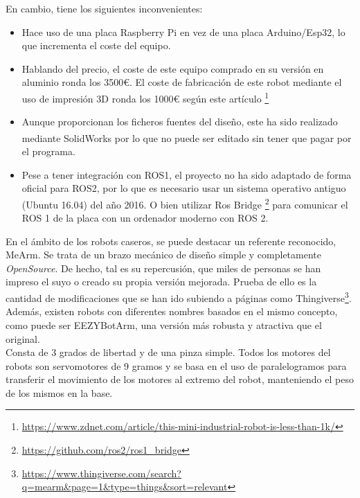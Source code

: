     En cambio, tiene los siguientes inconvenientes:
    \begin{itemize}
    \item Hace uso de una placa Raspberry Pi en vez de una placa Arduino/Esp32, lo que incrementa el coste del equipo. 
    \item Hablando del precio, el coste de este equipo comprado en su versión en aluminio ronda los 3500\euro. El coste de fabricación 
    de este robot mediante el uso de impresión 3D ronda los 1000\euro \xspace según este artículo \footnote{\url{https://www.zdnet.com/article/this-mini-industrial-robot-is-less-than-1k/}}
    \item Aunque proporcionan los ficheros fuentes del diseño, este ha sido realizado mediante SolidWorks\textsuperscript{\tiny\textregistered} por 
    lo que no puede ser editado sin tener que pagar por el programa.
    \item Pese a tener integración con ROS1, el proyecto no ha sido adaptado de forma oficial para ROS2, por lo que es necesario 
    usar un sistema operativo antiguo (Ubuntu 16.04) del año 2016. O bien utilizar Ros Bridge \footnote{\url{https://github.com/ros2/ros1\_bridge}} 
    para comunicar el ROS 1 de la placa con un  ordenador moderno con ROS 2.
    \end{itemize}
    \newpage
    En el ámbito de los robots caseros, se puede destacar un referente reconocido, MeArm. Se trata de un 
    brazo mecánico de diseño simple y completamente \textit{OpenSource}. De hecho, tal es su repercusión, que miles de personas 
    se han impreso el suyo o creado su propia versión mejorada. Prueba de ello es la cantidad de modificaciones que se han ido subiendo a  
    páginas como Thingiverse\footnote{\url{https://www.thingiverse.com/search?q=mearm&page=1&type=things&sort=relevant}}. Además, existen 
    robots con diferentes nombres basados en el mismo concepto, como puede ser EEZYBotArm, una versión más robusta y atractiva que el original. \\
    Consta de 3 grados de libertad y de una pinza simple. Todos los motores del robots son servomotores de 9 gramos y se basa en el uso de 
    paralelogramos para transferir el movimiento de los motores al extremo del robot, manteniendo el peso de los mismos en la base. 


